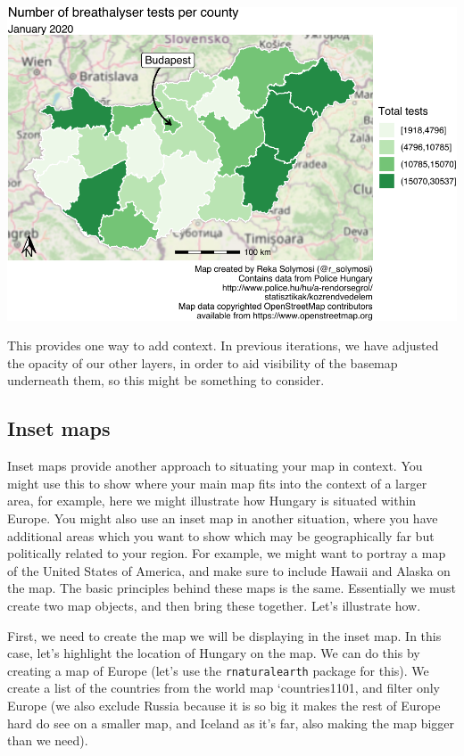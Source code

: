 \documentclass[
]{book}
\begin{document}
\includegraphics{crime_mapping_files/figure-latex/basemap-1.pdf}

This provides one way to add context. In previous iterations, we have adjusted the opacity of our other layers, in order to aid visibility of the basemap underneath them, so this might be something to consider.

\hypertarget{inset-maps}{%
\subsection{Inset maps}\label{inset-maps}}

Inset maps provide another approach to situating your map in context. You might use this to show where your main map fits into the context of a larger area, for example, here we might illustrate how Hungary is situated within Europe. You might also use an inset map in another situation, where you have additional areas which you want to show which may be geographically far but politically related to your region. For example, we might want to portray a map of the United States of America, and make sure to include Hawaii and Alaska on the map. The basic principles behind these maps is the same. Essentially we must create two map objects, and then bring these together. Let's illustrate how.

First, we need to create the map we will be displaying in the inset map. In this case, let's highlight the location of Hungary on the map. We can do this by creating a map of Europe (let's use the \texttt{rnaturalearth} package for this). We create a list of the countries from the world map `countries1101, and filter only Europe (we also exclude Russia because it is so big it makes the rest of Europe hard do see on a smaller map, and Iceland as it's far, also making the map bigger than we need).
\end{document}
